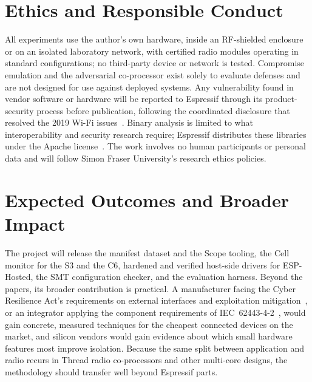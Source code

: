 \documentclass[conference,10pt]{IEEEtran}
\begin{document}
\section{Ethics and Responsible Conduct}
\label{sec:ethics}

All experiments use the author's own hardware, inside an RF-shielded enclosure or on an isolated laboratory network, with certified radio modules operating in standard configurations; no third-party device or network is tested. Compromise emulation and the adversarial co-processor exist solely to evaluate defenses and are not designed for use against deployed systems. Any vulnerability found in vendor software or hardware will be reported to Espressif through its product-security process before publication, following the coordinated disclosure that resolved the 2019 Wi-Fi issues~\cite{espressif2019zeropmk}. Binary analysis is limited to what interoperability and security research require; Espressif distributes these libraries under the Apache license~\cite{devreker2024liberating}. The work involves no human participants or personal data and will follow Simon Fraser University's research ethics policies.

\section{Expected Outcomes and Broader Impact}
\label{sec:impact}

The project will release the manifest dataset and the Scope tooling, the Cell monitor for the S3 and the C6, hardened and verified host-side drivers for ESP-Hosted, the SMT configuration checker, and the evaluation harness. Beyond the papers, its broader contribution is practical. A manufacturer facing the Cyber Resilience Act's requirements on external interfaces and exploitation mitigation~\cite{cra2024}, or an integrator applying the component requirements of IEC~62443-4-2~\cite{iec62443-4-2}, would gain concrete, measured techniques for the cheapest connected devices on the market, and silicon vendors would gain evidence about which small hardware features most improve isolation. Because the same split between application and radio recurs in Thread radio co-processors and other multi-core designs, the methodology should transfer well beyond Espressif parts.



\end{document}
